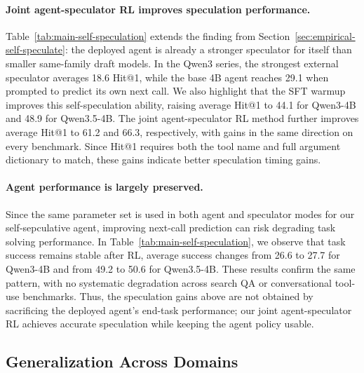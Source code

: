 \paragraph{Joint agent-speculator RL improves speculation performance.}
Table~\ref{tab:main-self-speculation} extends the finding from
Section~\ref{sec:empirical-self-speculate}: the deployed agent is already a
stronger speculator for itself than smaller same-family draft models. In the
Qwen3 series, the strongest external speculator averages 18.6 Hit@1, while the
base 4B agent reaches 29.1 when prompted to predict its own next call. 
We also highlight that the SFT warmup improves this self-speculation ability, raising average Hit@1 to
44.1 for Qwen3-4B and 48.9 for Qwen3.5-4B. The joint agent-speculator RL method further
improves average Hit@1 to 61.2 and 66.3, respectively, with gains in the same direction on every benchmark. 
Since Hit@1 requires both the tool name and full argument dictionary to match, 
these gains indicate better speculation timing gains.

\paragraph{Agent performance is largely preserved.}
Since the same parameter set is used in both agent and speculator modes for our self-sepculative agent, improving
next-call prediction can risk degrading task solving performance. In
Table~\ref{tab:main-self-speculation}, we observe that task success remains stable after RL,
average success changes from 26.6 to 27.7 for Qwen3-4B and from 49.2 to 50.6
for Qwen3.5-4B. These results confirm the same pattern, with no
systematic degradation across search QA or conversational tool-use benchmarks.
Thus, the speculation gains above are not obtained by sacrificing the deployed
agent's end-task performance; our joint agent-speculator RL achieves accurate
speculation while keeping the agent policy usable.

\subsection{Generalization Across Domains}
\label{sec:analysis:generalization}

